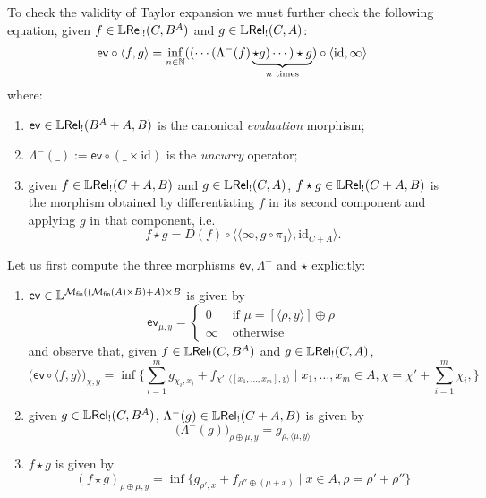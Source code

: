 To check the validity of Taylor expansion we must further check the following equation, given $f\in \mathbb{L} \mathsf{Rel}_!(C, B^{A})$ and $g\in \mathbb{L} \mathsf{Rel}_!(C,A)$:
$$
\mathsf{ev}\circ \langle f,g\rangle= \inf_{n\in \mathbb{N}}
(( \cdots (\Lambda^{-}(f) \underbrace{\star g)\cdots )\star g}_{n\text{ times}})\circ \langle \mathrm{id}, \infty\rangle
$$
where:
\begin{enumerate}
\item $\mathsf{ev}\in \mathbb{L} \mathsf{Rel}_!(B^{A}+A, B)$ is the canonical \emph{evaluation} morphism;

\item $\Lambda^{-}(\_):= \mathsf{ev}\circ (\_\times \mathrm{id})$ is the \emph{uncurry} operator;

\item given $f\in \mathbb{L} \mathsf{Rel}_!(C+A,B)$ and $g\in \mathbb{L} \mathsf{Rel}_!(C,A)$, 
$f\star g\in \mathbb{L} \mathsf{Rel}_!(C+A,B)$ is the morphism obtained by differentiating $f$ in its second component and applying $g$ in that component, i.e.~
$$
f\star g =  D(f)\circ \langle \langle \infty, g\circ \pi_{1}\rangle, \mathrm{id}_{C+A}\rangle.
$$ 

\end{enumerate}



Let us first compute the three morphisms $\mathsf{ev}, \Lambda^{-}$ and $\star$ explicitly:
\begin{enumerate}

\item $\mathsf{ev}\in \mathbb{L}^{ \mathcal{M}_{\mathsf{fin}}(  ( \mathcal{M}_{\mathsf{fin}}(A)\times B)       +  A    ) \times B  }$ is given by
$$\mathsf{ev}_{\mu,y}=
 \begin{cases}
 0 & \text{ if } \mu=[ \langle\rho, y\rangle]  \oplus \rho \\
 \infty & \text{ otherwise}
 \end{cases}
 $$
and observe that, given $f\in \mathbb{L} \mathsf{Rel}_!(C, B^{A})$ and $g\in \mathbb{L} \mathsf{Rel}_!(C,A)$, 
$$
\big(\mathsf{ev}\circ \langle f,g\rangle \big)_{\chi, y}= 
\inf\Big \{ 
\sum_{i=1}^{m}g_{\chi_{i},x_{i}}+
f_{\chi', \langle [x_{1},\dots, x_{m}],y\rangle}
\mid 
x_{1},\dots, x_{m}\in A,
\chi= \chi'+\sum_{i=1}^{m}\chi_{i}, 
\Big \}
$$



\item given $g\in \mathbb{L} \mathsf{Rel}_!(C, B^{A})$, 
$\Lambda^{-}(g)\in \mathbb{L} \mathsf{Rel}_!(C+A, B)$ is given by 
$$
\big(\Lambda^{-}(g)\big)_{\rho\oplus\mu,y}=g_{\rho, \langle \mu,y\rangle}
$$


\item $f\star g$ is given by 
$$
(f\star g)_{\rho\oplus\mu,y}=
\inf\Big\{
g_{\rho',x}+
f_{\rho''\oplus(\mu+x)}
\mid
x\in A,
\rho= \rho'+\rho''
\Big\}
$$

\end{enumerate}


